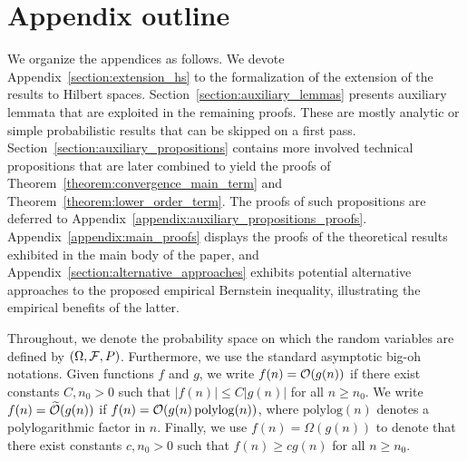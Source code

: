 \section*{Appendix outline}

We organize the appendices as follows. We devote Appendix~\ref{section:extension_hs} to the formalization of the extension of the results to Hilbert spaces.  Section~\ref{section:auxiliary_lemmas} presents auxiliary lemmata that are exploited in the remaining proofs. These are mostly analytic or simple probabilistic results that can be skipped on a first pass. Section~\ref{section:auxiliary_propositions} contains more involved technical propositions that are later combined to yield the proofs of Theorem~\ref{theorem:convergence_main_term} and Theorem~\ref{theorem:lower_order_term}. The proofs of such propositions are deferred to Appendix~\ref{appendix:auxiliary_propositions_proofs}.
Appendix~\ref{appendix:main_proofs} displays the proofs of the theoretical results exhibited in the main body of the paper, and Appendix~\ref{section:alternative_approaches} exhibits potential alternative approaches to the proposed empirical Bernstein inequality, illustrating the empirical benefits of the latter. %


Throughout, we denote the probability space on which the random variables are defined by $\left( \Omega, \mathcal{F}, P \right)$. Furthermore, we use the standard asymptotic big-oh notations. Given functions $f$ and $g$, we write $f(n) = \mathcal{O}(g(n))$ if there exist constants $C, n_0 > 0$ such that $|f(n)| \leq C |g(n)|$ for all $n \geq n_0$. We write $f(n) = \widetilde{\mathcal{O}}(g(n))$ if $f(n) = \mathcal{O}(g(n) \, \mathrm{polylog}(n))$, where $\mathrm{polylog}(n)$ denotes a polylogarithmic factor in $n$. Finally, we use $f(n) = \Omega(g(n))$ to denote that there exist constants $c, n_0 > 0$ such that $f(n) \geq c g(n)$ for all $n \geq n_0$.